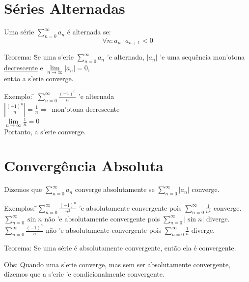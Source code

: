 \documentclass{article}
\begin{document}
\newpage
\section{S\'eries Alternadas}
Uma s\'erie $\sum\limits_{n=0}^\infty a_n$ \'e alternada se:
\[ \forall n: a_n \cdot a_{n+1} < 0\]
\begin{tabbing}
  Teorema: \=Se uma s\a'{e}rie $\sum\limits_{n=0}^\infty a_n$ \a'{e} alternada, $|a_n|$ \a'{e} uma sequ\^encia mon\a'{o}tona \underline{decrescente} e $\lim\limits_{n\to\infty} |a_n| = 0$, \\
  \>ent\~ao a s\a'{e}rie converge.
\end{tabbing}

\begin{tabbing}
  Exemplo: \= $\sum\limits_{n=0}^\infty \frac{{(-1)}^n}{n}$ \a'{e} alternada \\[5pt]
  \> $|\frac{{(-1)}^n}{n}| = \frac{1}{n} \Rightarrow$ mon\a'{o}tona decrescente \\[5pt]
  \> $\lim\limits_{n\to\infty} \frac{1}{n} = 0$ \\[5pt]
  \> Portanto, a s\a'{e}rie converge.
\end{tabbing}



\section{Converg\^encia Absoluta}

Dizemos que $\sum\limits_{n=0}^\infty a_n$ converge absolutamente se $\sum\limits_{n=0}^\infty |a_n|$ converge. \\
\begin{tabbing}
  Exemplos: \=$\sum\limits_{n=0}^\infty \frac{{(-1)}^n}{n^2}$ \a'{e} absolutamente convergente pois $\sum\limits_{n=0}^\infty \frac{1}{n^2}$ converge. \\
  \> $\sum\limits_{n=0}^\infty \sin n$ n\~ao \a'{e} absolutamente convergente pois $\sum\limits_{n=0}^\infty |\sin n|$ diverge. \\
  \> $\sum\limits_{n=0}^\infty \frac{{(-1)}^n}{n}$ n\~ao \a'{e} absolutamente convergente pois $\sum\limits_{n=0}^\infty \frac{1}{n}$ diverge. \\
\end{tabbing}
Teorema: Se uma s\'erie \'e absolutamente convergente, ent\~ao ela \'e convergente.
\begin{tabbing}
  Obs: \=Quando uma s\a'{e}rie converge, mas sem ser absolutamente convergente, \\
  \> dizemos que a s\a'{e}rie \a'{e} condicionalmente convergente.
\end{tabbing}
\end{document}
